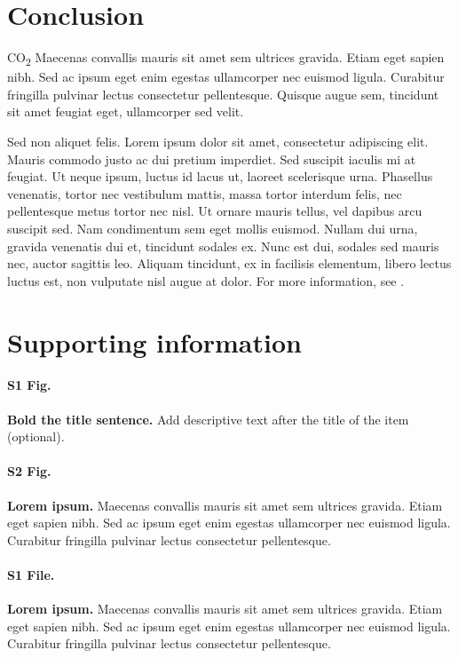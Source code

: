 \documentclass[10pt,letterpaper]{article}
\begin{document}
\section*{Conclusion}

CO\textsubscript{2} Maecenas convallis mauris sit amet sem ultrices gravida. Etiam eget sapien nibh. Sed ac ipsum eget enim egestas ullamcorper nec euismod ligula. Curabitur fringilla pulvinar lectus consectetur pellentesque. Quisque augue sem, tincidunt sit amet feugiat eget, ullamcorper sed velit.

Sed non aliquet felis. Lorem ipsum dolor sit amet, consectetur adipiscing elit. Mauris commodo justo ac dui pretium imperdiet. Sed suscipit iaculis mi at feugiat. Ut neque ipsum, luctus id lacus ut, laoreet scelerisque urna. Phasellus venenatis, tortor nec vestibulum mattis, massa tortor interdum felis, nec pellentesque metus tortor nec nisl. Ut ornare mauris tellus, vel dapibus arcu suscipit sed. Nam condimentum sem eget mollis euismod. Nullam dui urna, gravida venenatis dui et, tincidunt sodales ex. Nunc est dui, sodales sed mauris nec, auctor sagittis leo. Aliquam tincidunt, ex in facilisis elementum, libero lectus luctus est, non vulputate nisl augue at dolor. For more information, see .

\section*{Supporting information}

\paragraph*{S1 Fig.}
\label{S1_Fig}
{\bf Bold the title sentence.} Add descriptive text after the title of the item (optional).

\paragraph*{S2 Fig.}
\label{S2_Fig}
{\bf Lorem ipsum.} Maecenas convallis mauris sit amet sem ultrices gravida. Etiam eget sapien nibh. Sed ac ipsum eget enim egestas ullamcorper nec euismod ligula. Curabitur fringilla pulvinar lectus consectetur pellentesque.

\paragraph*{S1 File.}
\label{S1_File}
{\bf Lorem ipsum.}  Maecenas convallis mauris sit amet sem ultrices gravida. Etiam eget sapien nibh. Sed ac ipsum eget enim egestas ullamcorper nec euismod ligula. Curabitur fringilla pulvinar lectus consectetur pellentesque.
\end{document}
